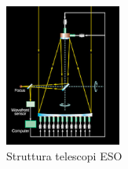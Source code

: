 \begin{figure}
    \centering
    \vspace{-10pt}
    \includegraphics[width=0.34\textwidth]{Immagini/Capitolo2/Struttura_telescopio_ESO.PNG}
    \caption{Struttura telescopi ESO}
    \label{im:struttura-ESO}
    \vspace{-10pt}
\end{figure}

